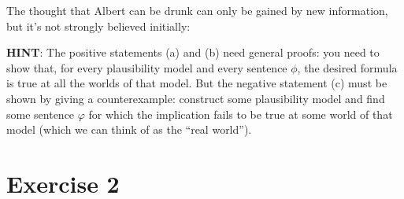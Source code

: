 \documentclass[leqno]{article}
\begin{document}
The thought that Albert can be drunk can only be gained by new information, but
it's not strongly believed initially:

\begin{center}
\end{center}

\textbf{HINT}: The positive statements (a) and (b) need general proofs: you
need to show that, for every plausibility model and every sentence $\phi$, the
desired formula is true at all the worlds of that model. But the negative
statement (c) must be shown by giving a counterexample: construct some
plausibility model and find some sentence $\varphi$ for which the implication
fails to be true at some world of that model (which we can think of as the
“real world”).

\section*{Exercise 2}



\end{document}
